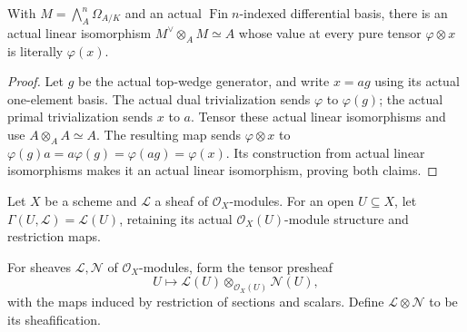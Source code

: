 \begin{theorem}
\label{sc0-canonical-port:ext:actual-affine-coordinate-dual-evaluation}
\leanok
With \(M=\bigwedge_A^n\Omega_{A/K}\) and an actual
\(\operatorname{Fin}n\)-indexed differential basis,
there is an actual linear isomorphism
\(M^\vee\otimes_AM\simeq A\) whose value at every
pure tensor \(\varphi\otimes x\) is literally
\(\varphi(x)\).
\end{theorem}
\begin{proof}
Let \(g\) be the actual top-wedge generator, and
write \(x=a g\) using its actual one-element basis.
The actual dual trivialization sends \(\varphi\)
to \(\varphi(g)\); the actual primal trivialization
sends \(x\) to \(a\). Tensor these actual linear
isomorphisms and use \(A\otimes_AA\simeq A\).
The resulting map sends \(\varphi\otimes x\)
to \(\varphi(g)a=a\varphi(g)=\varphi(a g)=\varphi(x)\).
Its construction from actual linear isomorphisms
makes it an actual linear isomorphism, proving both
claims.
\end{proof}

\begin{definition}
\label{sc0-canonical-port:geom:module-sheaf-sections}
\leanok
Let \(X\) be a scheme and \(\mathcal L\) a sheaf of
\(\mathcal O_X\)-modules. For an open \(U\subseteq X\), let
\(\Gamma(U,\mathcal L)=\mathcal L(U)\), retaining its actual
\(\mathcal O_X(U)\)-module structure and restriction maps.
\end{definition}

\begin{definition}
\label{sc0-canonical-port:geom:tensor-sheaf}
\leanok
For sheaves \(\mathcal L,\mathcal N\) of
\(\mathcal O_X\)-modules, form the tensor presheaf
\[
 U\longmapsto\mathcal L(U)\otimes_{\mathcal O_X(U)}\mathcal N(U),
\]
with the maps induced by restriction of sections and scalars.
Define \(\mathcal L\otimes\mathcal N\) to be its sheafification.
\end{definition}

